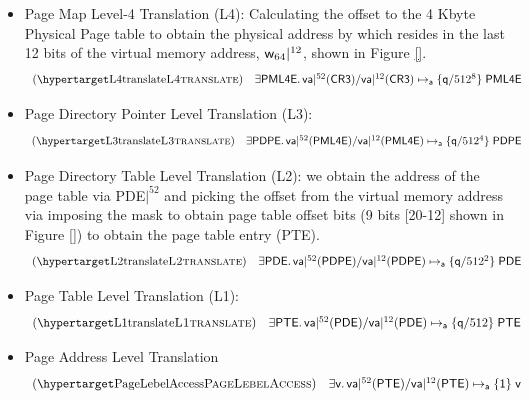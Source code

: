 \begin{itemize}
  \item Page Map Level-4 Translation (L4): Calculating the offset to the 4 \textsf{Kbyte Physical Page} table to obtain the  physical address by  which resides in the last 12 bits of the virtual memory address, $\mathsf{w}_{64}|^{12}$,  shown in Figure \ref{}.
    \[ \begin{array}{l}
      \hbox{(\TirNameStyle{{L4translate}})} \quad
      \exists \entryf \ldotp \nfpointsto{\mask\vaddr\ft\crthree}{\mask\vaddr\tw\crthree}\entryf\qfracfotsss\naddr
      \end{array}
      \]
  \item Page Directory Pointer Level Translation (L3):
    \[\begin{array}{l}
    \hbox{(\TirNameStyle{{L3translate}})} \quad
    \exists \entrytr \ldotp \nfpointsto{\mask\vaddr\ft\entryf}{\mask\vaddr\tw\entryf}\entrytr\qfracfotss\naddr
    \end{array}
    \]
  \item Page Directory Table Level Translation (L2):  we obtain the address of the page table via \textsf{PDE}$|^{52}$ and picking the offset from the virtual memory address via imposing the mask to obtain page table offset bits (9 bits [20-12] shown in Figure \ref{}) to obtain the page table entry (\textsf{PTE}).
    \[ \begin{array}{l}
            \hbox{(\TirNameStyle{{L2translate}})} \quad 
       \exists \entrytw \ldotp \nfpointsto{\mask\vaddr\ft\entrytr}{\mask\vaddr\tw\entrytr}\entrytw\qfracfots\naddr
      \end{array}
      \]
  \item Page Table Level Translation (L1):
    \[ \begin{array}{l}
      \hbox{(\TirNameStyle{{L1translate}})} \quad
      \exists \entryo \ldotp \nfpointsto{\mask\vaddr\ft\entrytw}{\mask\vaddr\tw\entrytw}\entryo\qfracfot\naddr
      \end{array}
      \]
  \item Page Address Level Translation
    \[ \begin{array}{l}
      \hbox{(\TirNameStyle{{PageLebelAccess}})} \quad
      \exists \vpage \ldotp \nfpointsto{\mask\vaddr\ft\entryo}{\mask\vaddr\tw\entryo}\vpage\qfracone\naddr
      \end{array}
      \]
    
\end{itemize}
